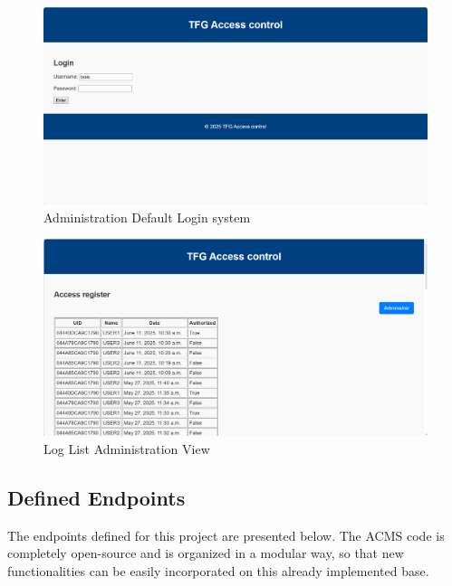 \begin{figure}[h]
	\centering
	\includegraphics[width=\textwidth]{imaxes/login} 
	\caption{Administration Default Login system}
	\label{fig:login_view}
\end{figure}

\begin{figure}[H]
	\centering
	\includegraphics[width=\textwidth]{imaxes/loglist} %
	\caption{Log List Administration View}
	\label{fig:log_list_view}
\end{figure}

\clearpage

\subsection{Defined Endpoints}
The endpoints defined for this project are presented below. The ACMS code is completely open-source and is organized in a modular way, so that new functionalities can be easily incorporated on this already implemented base.

